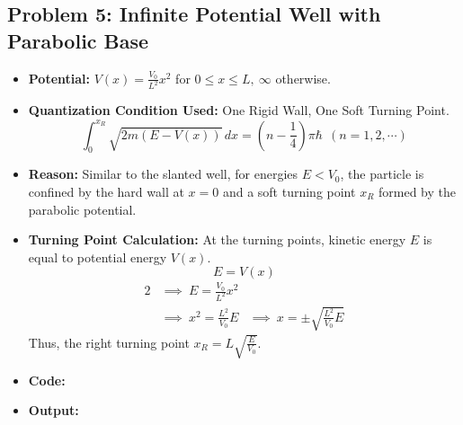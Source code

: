 \documentclass[12pt, a4paper, twoside]{article}
\begin{document}
        \subsection{Problem 5: Infinite Potential Well with Parabolic Base}
        \begin{itemize}
            \item {\bf Potential: } $V(x) = \frac{V_0}{L^2} x^2$ for $0 \leq x \leq L, ~\infty$ otherwise.
            \item {\bf Quantization Condition Used: } One Rigid Wall, One Soft Turning Point. $${\int_{0}^{x_R} \sqrt{2m(E-V(x))} \, dx} = {\left(n - \frac{1}{4}\right) \pi \hbar} ~~ (n = 1, 2, \cdots)$$
            \item {\bf Reason: }  Similar to the slanted well, for energies $E < V_0$, the particle is confined by the hard wall at $x=0$ and a soft turning point $x_R$ formed by the parabolic potential.
            \item {\bf Turning Point Calculation: } At the turning points, kinetic energy $E$ is equal to potential energy $V(x)$. $$E = V(x)$$ \begin{alignat*}{2}
                &\implies ~ E = \frac{V_0}{L^2} x^2 \\
                &\implies ~ x^2 = \frac{L^2}{V_0} E
                &\implies ~ x = \pm \sqrt{\frac{L^2}{V_0}E}
            \end{alignat*}
            Thus, the right turning point $ \boxed{x_R = L \sqrt{\frac{E}{V_0}}}$.
            \item {\bf Code: } 
            \item {\bf Output: } 
        \end{itemize}
        
\end{document}
